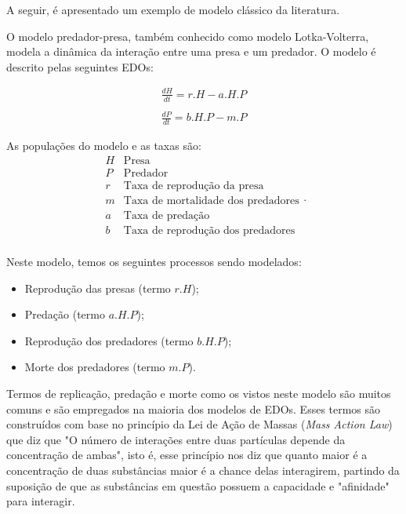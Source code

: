 \documentclass[
	12pt,				%
	openright,			%
	oneside,			%
	a4paper,			%
	main=brazil,
	english,			%
	]{ufsj-abntex2}
\begin{document}
A seguir, é apresentado um exemplo de modelo clássico da literatura. 


O modelo predador-presa, também conhecido como modelo Lotka-Volterra, modela a dinâmica da interação entre uma presa e um predador. O modelo é descrito pelas seguintes EDOs: 

\begin{equation}\label{eq:predadorpresa}
    \begin{array}{lr}
    \frac{dH}{dt} = r.H - a.H.P
    \\
    \\
    \frac{dP}{dt} = b.H.P - m.P
    \end{array}
\end{equation}

As populações do modelo e as taxas são: 
\[
    \begin{array}{lr}
    H & \text{Presa}\\
    P & \text{Predador}\\
    r & \text{Taxa de reprodução da presa}\\
    m & \text{Taxa de mortalidade dos predadores}\\
    a & \text{Taxa de predação}\\
    b & \text{Taxa de reprodução dos predadores}\\
    \end{array}.
\]

Neste modelo, temos os seguintes processos sendo modelados: 
\begin{itemize}
    \item Reprodução das presas (termo $r.H$);
    \item Predação (termo $a.H.P$);
    \item Reprodução dos predadores (termo $b.H.P$);
    \item Morte dos predadores (termo $m.P$). 
\end{itemize}

Termos de replicação, predação e morte como os vistos neste modelo são muitos comuns e são empregados na maioria dos modelos de EDOs. Esses termos são construídos com base no princípio da Lei de Ação de Massas (\textit{Mass Action Law}) que diz que "O número de interações entre duas partículas depende da concentração de ambas", isto é, esse princípio nos diz que quanto maior é a concentração de duas substâncias maior é a chance delas interagirem, partindo da suposição de que as substâncias em questão possuem a capacidade e "afinidade" para interagir.
\end{document}
